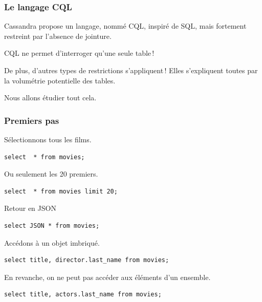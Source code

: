 
\begin{frame} \frametitle{Le langage CQL}

Cassandra propose un langage, nommé CQL, inspiré de SQL, 
mais fortement restreint par l'absence de jointure. 

\vfill

CQL ne permet d'interroger qu'une seule table\,!

\vfill

De plus, d'autres types de restrictions s'appliquent\,! Elles s'expliquent toutes
par la volumétrie potentielle des tables.

\vfill

Nous allons étudier
tout cela.
\end{frame}



\begin{frame}[fragile] \frametitle{Premiers pas}

Sélectionnons tous les films.

\begin{verbatim}
select  * from movies;
\end{verbatim}

\vfill

Ou seulement les 20 premiers.
\begin{verbatim}
select  * from movies limit 20;
\end{verbatim}

\vfill
Retour en JSON
\begin{verbatim}
select JSON * from movies;
\end{verbatim}

\vfill
Accédons à un objet imbriqué.
\begin{verbatim}
select title, director.last_name from movies;
\end{verbatim}

\vfill
En revanche, on ne peut pas accéder aux éléments d'un ensemble.
\begin{verbatim}
select title, actors.last_name from movies;
\end{verbatim}
\end{frame}


